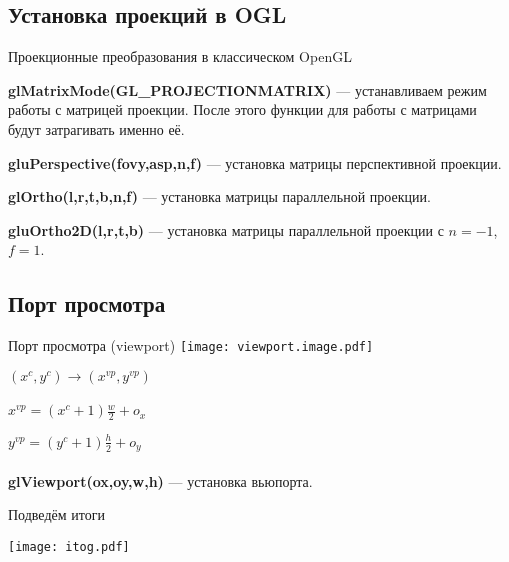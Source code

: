 \documentclass[10pt]{beamer}
\begin{document}
	
	\subsection{Установка проекций в OGL}
	
	\begin{frame}{Проекционные преобразования в классическом OpenGL}
		
		\textbf{glMatrixMode(GL\_PROJECTIONMATRIX)} --- устанавливаем режим работы с матрицей проекции. После этого функции для работы с матрицами будут затрагивать именно её.
		
		\textbf{gluPerspective(fovy,asp,n,f)} --- установка матрицы перспективной проекции.
		
		\textbf{glOrtho(l,r,t,b,n,f)} --- установка матрицы параллельной проекции.
		
		\textbf{gluOrtho2D(l,r,t,b)} --- установка матрицы параллельной проекции с $n=-1$, $f=1$.
		
		
	\end{frame}
	
	
	\subsection{Порт просмотра}
	\begin{frame}{Порт просмотра (viewport)}
		{
			\texttt{[image: viewport.image.pdf]}
		}
		{
			$(x^c,y^c) \rightarrow (x^{vp},y^{vp})$ \\ ~ \\
			
			$x^{vp} = (x^c+1)\frac{w}{2}+o_x$
			
			$y^{vp} = (y^c+1)\frac{h}{2}+o_y$ \\ ~ \\
			
			\textbf{glViewport(ox,oy,w,h)} --- установка вьюпорта.
			
			
		}
		
	\end{frame}
	
	
	\begin{frame}{Подведём итоги}
		
		\centering
		
		\texttt{[image: itog.pdf]}
		
		
	\end{frame}
	

\begin{comment}
\end{comment}
\end{document}
